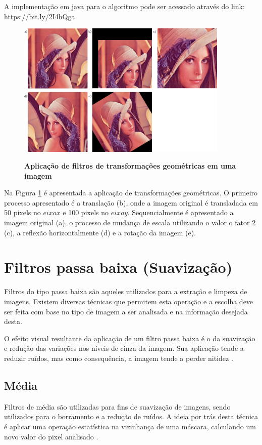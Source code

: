 \documentclass[
	12pt,				%
	oneside,			%
	a4paper,			%
	english,			%
	french,				%
	spanish,			%
	brazil,				%
	]{abntex2}
\begin{document}
A implementação em java para o algoritmo pode ser acessado através do link: \url{https://bit.ly/2I4hQga}

\begin{figure}[ht]
\centering
\caption{\textbf{Aplicação de filtros de transformações geométricas em uma imagem}}
\includegraphics[width=0.9\textwidth]{imagens/transformacoesgeometricas.png}
\sourceAuthor
\label{fig:transformacoesgeometricas}
\end{figure}

Na Figura \ref{fig:transformacoesgeometricas} é apresentada a aplicação de transformações geométricas. O primeiro processo apresentado é a translação (b), onde a imagem original é transladada em 50 pixels no \(eixo x\) e 100 pixels no \(eixo y\). Sequencialmente é apresentado a imagem original (a), o processo de mudança de escala utilizando o valor o fator 2 (c), a reflexão horizontalmente (d) e a rotação da imagem (e). 

\section{Filtros passa baixa (Suavização)}
Filtros do tipo passa baixa são aqueles utilizados para a extração e limpeza de imagens. Existem diversas técnicas que permitem esta operação e a escolha deve ser feita com base no tipo de imagem a ser analisada e na informação desejada desta. 

O efeito visual resultante da aplicação de um filtro passa baixa é o da suavização e redução das variações nos níveis de cinza da imagem. Sua aplicação tende a reduzir ruídos, mas como consequência, a imagem tende a perder nitidez \cite{conciAzevedoLeta:2008}.

\subsection{Média}
Filtros de média são utilizadas para fins de suavização de imagens, sendo utilizados para o borramento e a redução de ruídos. A ideia por trás desta técnica é aplicar uma operação estatística na vizinhança de uma máscara, calculando um novo valor do pixel analisado \cite{gonzalesWoods:2008}. 
\end{document}

